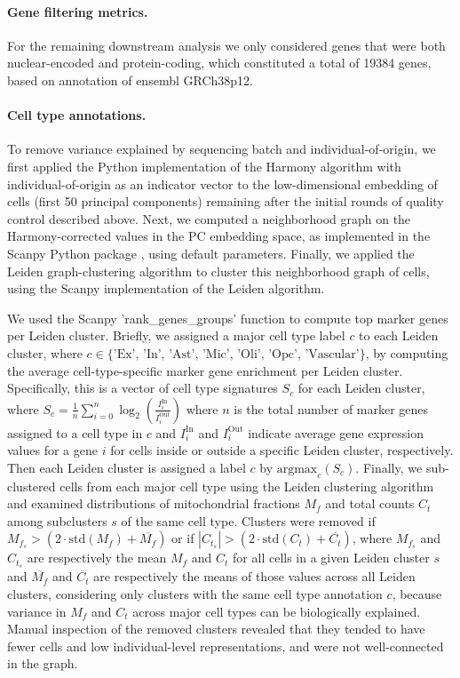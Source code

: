 \paragraph{Gene filtering metrics.}
For the remaining downstream analysis we only considered genes that were both nuclear-encoded and protein-coding, which constituted a total of 19384 genes, based on annotation of ensembl GRCh38p12. 

\paragraph{Cell type annotations.}
To remove variance explained by sequencing batch and individual-of-origin, we first applied the Python implementation of the Harmony algorithm \cite{Korsunsky2019-ab} with individual-of-origin as an indicator vector to the low-dimensional embedding of cells (first 50 principal components) remaining after the initial rounds of quality control described above. Next, we computed a neighborhood graph on the Harmony-corrected values in the PC embedding space, as implemented in the Scanpy Python package \cite{Wolf2018-kz}, using default parameters. Finally, we applied the Leiden graph-clustering algorithm to cluster this neighborhood graph of cells, using the Scanpy implementation of the Leiden algorithm\cite{Traag2018-uw}.

We used the Scanpy 'rank\_genes\_groups' function to compute top marker genes per Leiden cluster. Briefly, we assigned a major cell type label $ c $ to each Leiden cluster, where $ c \in \{\text{'Ex', 'In', 'Ast', 'Mic', 'Oli', 'Opc', 'Vascular'}\} $, by computing the average cell-type-specific marker gene enrichment per Leiden cluster. Specifically, this is a vector of cell type signatures $ S_c $ for each Leiden cluster, where 
$ S_c = \frac{1}{n} \sum_{i=0}^{n} \log_2\left(\frac{I_i^{\text{In}}}{I_i^{\text{Out}}}\right) $
where $ n $ is the total number of marker genes assigned to a cell type in $ c $ and $ I_i^{\text{In}} $ and $ I_i^{\text{Out}} $ indicate average gene expression values for a gene $ i $ for cells inside or outside a specific Leiden cluster, respectively. Then each Leiden cluster is assigned a label $ c $ by 
$ \text{argmax}_c(S_c) $.
Finally, we sub-clustered cells from each major cell type using the Leiden clustering algorithm and examined distributions of mitochondrial fractions $ M_f $ and total counts $ C_t $ among subclusters $ s $ of the same cell type. Clusters were removed if 
$ M_{f_s} > (2 \cdot \text{std}(M_f) + \overline{M_f}) $ 
or if 
$ |C_{t_s}| > (2 \cdot \text{std}(C_t) + \overline{C_t}) $, 
where $ M_{f_s} $ and $ C_{t_s} $ are respectively the mean $ M_f $ and $ C_t $ for all cells in a given Leiden cluster $ s $ and $ \overline{M_f} $ and $ \overline{C_t} $ are respectively the means of those values across all Leiden clusters, considering only clusters with the same cell type annotation $ c $, because variance in $ M_f $ and $ C_t $ across major cell types can be biologically explained. Manual inspection of the removed clusters revealed that they tended to have fewer cells and low individual-level representations, and were not well-connected in the graph.

